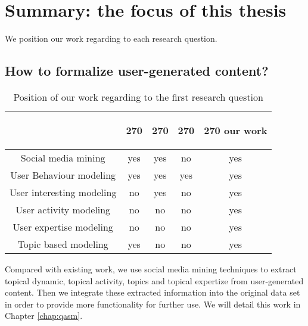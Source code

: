 \section{Summary: the focus of this thesis}
We position our work regarding to each research question. 

\subsection {How to formalize user-generated content? }
    
    \begin{table}[htp]
        \centering
        \begin{tabular}{c c c c c}
        &
        \begin{turn}{270}
            \cite{chp2socialsemanticminingDBLP:series/synthesis/2015Omitola} \end{turn} 
        &
        \begin{turn}{270} 
            \cite{chp2siocontoDBLP:conf/atal/PassantBBD09}
        \end{turn}
        &
        \begin{turn}{270} 
            \cite{chp2usermodelingplumbaum2015user}
        \end{turn}
        &
        \begin{turn}{270}
        our work
        \end{turn}
        \\ \hline
        Social media mining & yes & yes & no & yes \\ \hline
        User Behaviour modeling & yes & yes & yes &yes \\ \hline
        User interesting modeling & no &yes & no & yes\\ \hline
        User activity modeling & no & no & no & yes\\ \hline
        User expertise modeling & no & no & no & yes \\ \hline
        Topic based modeling & yes & no & no &yes \\ \hline
        \end{tabular}
        \caption{Position of our work regarding to the first research question}
        \label{tab:rq1compare}
    \end{table}
    Compared with existing work, we use social media mining techniques to extract topical dynamic, topical activity, topics and topical expertize from user-generated content. Then we integrate these extracted information into the original data set in order to provide more functionality for further use. We will detail this work in Chapter \ref{chap:qasm}. 
    


